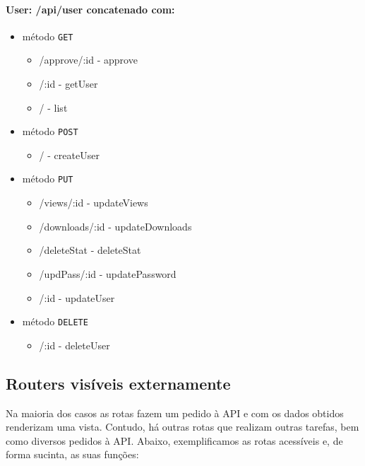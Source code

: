 \paragraph{User: /api/user concatenado com:}
        \begin{itemize}
            \item método \texttt{GET}
                \begin{itemize}
                    \item /approve/:id - approve
                    \item /:id - getUser
                    \item / - list
                \end{itemize}
            \item método \texttt{POST}
                \begin{itemize}
                    \item / - createUser
                \end{itemize}
            \item método \texttt{PUT}
                \begin{itemize}
                    \item /views/:id - updateViews
                    \item /downloads/:id - updateDownloads
                    \item /deleteStat - deleteStat
                    \item /updPass/:id - updatePassword
                    \item /:id - updateUser
                \end{itemize}
            \item método \texttt{DELETE}
                \begin{itemize}
                    \item /:id - deleteUser
                \end{itemize}
        \end{itemize}

\subsection{Routers visíveis externamente}
Na maioria dos casos as rotas fazem um pedido à API e com os dados obtidos renderizam uma vista. Contudo, há outras rotas que realizam outras tarefas, bem como diversos pedidos à API. Abaixo, exemplificamos as rotas acessíveis e, de forma sucinta, as suas funções:


